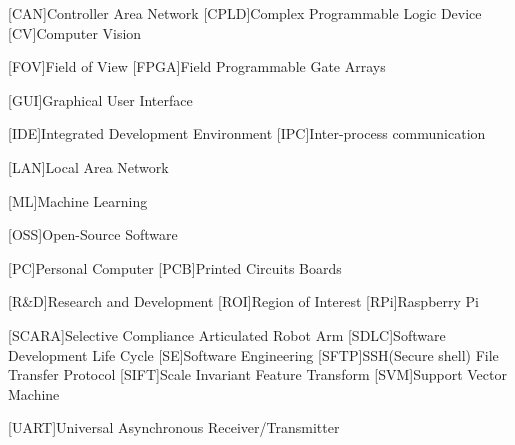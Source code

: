 \begin{acronym}
	[CAN]{Controller Area Network}
	[CPLD]{Complex Programmable Logic Device}
	[CV]{Computer Vision}
	
	[FOV]{Field of View}
	[FPGA]{Field Programmable Gate Arrays}
	
	[GUI]{Graphical User Interface}
	
	[IDE]{Integrated Development Environment}
	[IPC]{Inter-process communication}
	
	[LAN]{Local Area Network}
	
	[ML]{Machine Learning}
	
	[OSS]{Open-Source Software}
	
	[PC]{Personal Computer}
	[PCB]{Printed Circuits Boards}
	
	[R\&D]{Research and Development}
	[ROI]{Region of Interest}
	[RPi]{Raspberry Pi}
			
	[SCARA]{Selective Compliance Articulated Robot Arm}
	[SDLC]{Software Development Life Cycle}
	[SE]{Software Engineering}
	[SFTP]{SSH(Secure shell) File Transfer Protocol}
	[SIFT]{Scale Invariant Feature Transform}
	[SVM]{Support Vector Machine}
	
	[UART]{Universal Asynchronous Receiver/Transmitter}
\end{acronym}


